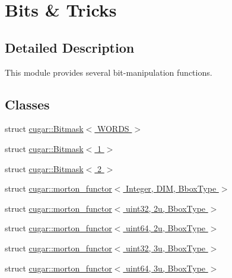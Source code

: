\hypertarget{group___bits_module}{}\section{Bits \& Tricks}
\label{group___bits_module}


\subsection{Detailed Description}
This module provides several bit-\/manipulation functions. \subsection*{Classes}
\begin{DoxyCompactItemize}
\item 
struct \hyperlink{structcugar_1_1_bitmask}{cugar\+::\+Bitmask$<$ W\+O\+R\+D\+S $>$}
\item 
struct \hyperlink{structcugar_1_1_bitmask_3_011_01_4}{cugar\+::\+Bitmask$<$ 1 $>$}
\item 
struct \hyperlink{structcugar_1_1_bitmask_3_012_01_4}{cugar\+::\+Bitmask$<$ 2 $>$}
\item 
struct \hyperlink{structcugar_1_1morton__functor}{cugar\+::morton\+\_\+functor$<$ Integer, D\+I\+M, Bbox\+Type $>$}
\item 
struct \hyperlink{structcugar_1_1morton__functor_3_01uint32_00_012u_00_01_bbox_type_01_4}{cugar\+::morton\+\_\+functor$<$ uint32, 2u, Bbox\+Type $>$}
\item 
struct \hyperlink{structcugar_1_1morton__functor_3_01uint64_00_012u_00_01_bbox_type_01_4}{cugar\+::morton\+\_\+functor$<$ uint64, 2u, Bbox\+Type $>$}
\item 
struct \hyperlink{structcugar_1_1morton__functor_3_01uint32_00_013u_00_01_bbox_type_01_4}{cugar\+::morton\+\_\+functor$<$ uint32, 3u, Bbox\+Type $>$}
\item 
struct \hyperlink{structcugar_1_1morton__functor_3_01uint64_00_013u_00_01_bbox_type_01_4}{cugar\+::morton\+\_\+functor$<$ uint64, 3u, Bbox\+Type $>$}
\end{DoxyCompactItemize}
